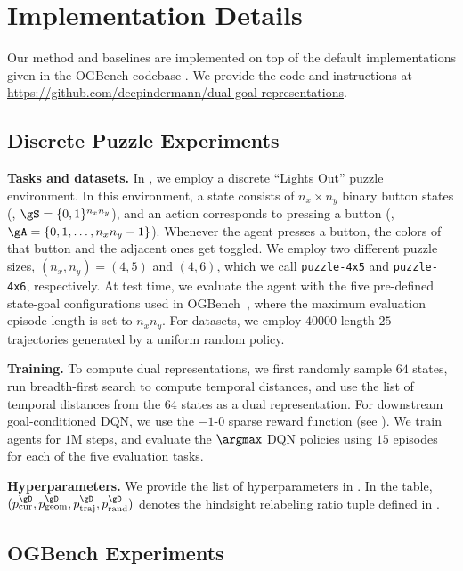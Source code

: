 \documentclass[final]{article} %
\theoremstyle{plain}
\theoremstyle{definition}
\theoremstyle{remark}
\renewcommand{\tt}[1]{\texttt{#1}}
\begin{document}
\section{Implementation Details}
\label{sec:impl_details}
Our method and baselines are implemented on top of the default implementations given in the OGBench codebase \citep{ogbench_park2025}.
We provide the code and instructions at \url{https://github.com/deepindermann/dual-goal-representations}.

\subsection{Discrete Puzzle Experiments}
\label{sec:impl_pure}

\textbf{Tasks and datasets.}
In , we employ a discrete ``Lights Out'' puzzle environment.
In this environment,
a state consists of $n_x \times n_y$ binary button states (\ie, $\gS = \{0, 1\}^{n_xn_y}$),
and an action corresponds to pressing a button (\ie, $\gA = \{0, 1, \ldots, n_xn_y-1\}$).
Whenever the agent presses a button, the colors of that button and the adjacent ones get toggled.
We employ two different puzzle sizes, $(n_x, n_y) = (4, 5)$ and $(4, 6)$,
which we call \tt{puzzle-4x5} and \tt{puzzle-4x6}, respectively.
At test time, we evaluate the agent with the five pre-defined state-goal configurations used in OGBench~\citep{ogbench_park2025},
where the maximum evaluation episode length is set to $n_xn_y$.
For datasets, we employ $40000$ length-$25$ trajectories generated by a uniform random policy.

\textbf{Training.}
To compute dual representations, we first randomly sample $64$ states,
run breadth-first search to compute temporal distances,
and use the list of temporal distances from the $64$ states as a dual representation.
For downstream goal-conditioned DQN, we use the $-1$-$0$ sparse reward function (see ).
We train agents for $1$M steps, and evaluate the $\argmax$ DQN policies
using $15$ episodes for each of the five evaluation tasks.

\textbf{Hyperparameters.}
We provide the list of hyperparameters in .
In the table, $(p^\gD_\mathrm{cur}, p^\gD_\mathrm{geom}, p^\gD_\mathrm{traj}, p^\gD_\mathrm{rand})$
denotes the hindsight relabeling ratio tuple defined in \citet{ogbench_park2025}.

\subsection{OGBench Experiments}
\label{sec:impl_ogb}
\end{document}
